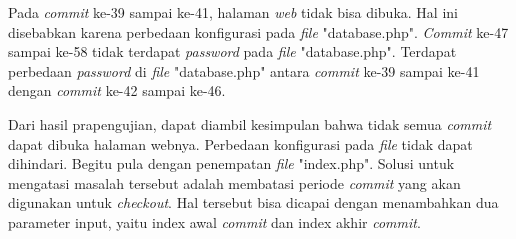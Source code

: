 Pada \textit{commit} ke-39 sampai ke-41, halaman \textit{web} tidak bisa dibuka. Hal ini disebabkan karena perbedaan konfigurasi pada \textit{file} "database.php". \textit{Commit} ke-47 sampai ke-58 tidak terdapat \textit{password} pada \textit{file} "database.php". Terdapat perbedaan \textit{password} di \textit{file} "database.php" antara \textit{commit} ke-39 sampai ke-41 dengan \textit{commit} ke-42 sampai ke-46.

Dari hasil prapengujian, dapat diambil kesimpulan bahwa tidak semua \textit{commit} dapat dibuka halaman webnya. Perbedaan konfigurasi pada \textit{file} tidak dapat dihindari. Begitu pula dengan penempatan \textit{file} "index.php". Solusi untuk mengatasi masalah tersebut adalah membatasi periode \textit{commit} yang akan digunakan untuk \textit{checkout}. Hal tersebut bisa dicapai dengan menambahkan dua parameter input, yaitu index awal \textit{commit} dan index akhir \textit{commit}. 




